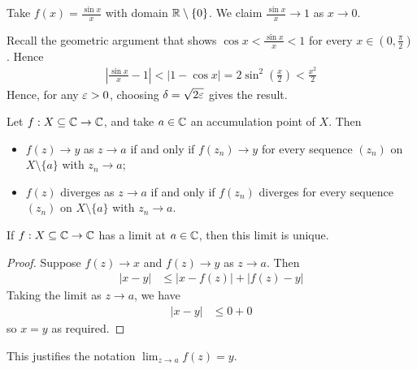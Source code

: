 \documentclass{../template/note}
\begin{document}
    \begin{example}
        Take \(f(x) = \frac{\sin x}{x}\) with domain \(\mathbb R \setminus \{0\}\). We claim \(\frac{\sin x}{x} \to 1\) as \(x \to 0\).
        
        Recall the geometric argument that shows \(\cos x < \frac{\sin x}{x} < 1\) for every \(x \in (0, \frac{\pi}2)\). Hence
        \begin{align*}
            \left|\frac{\sin x}x - 1\right| < \left|1-\cos x\right| = 2\sin^2\left(\frac x 2\right) < \frac{x^2}{2}
        \end{align*}
        Hence, for any \(\varepsilon > 0\), choosing \(\delta = \sqrt{2\varepsilon}\) gives the result.
    \end{example}
    
    \begin{lemma}
        Let \(f: X \subseteq \mathbb C \to \mathbb C\), and take \(a \in \mathbb C\) an accumulation point of \(X\). Then
        \begin{itemize}
            \item \(f(z) \to y\) as \(z \to a\) if and only if \(f(z_n) \to y\) for every sequence \((z_n)\) on \(X \setminus \{a\}\) with \(z_n \to a\);
            \item \(f(z)\) diverges as \(z \to a\) if and only if \(f(z_n)\) diverges for every sequence \((z_n)\) on \(X \setminus \{a\}\) with \(z_n \to a\).
        \end{itemize}
    \end{lemma}
    
    \begin{lemma}
        If \(f: X \subseteq \mathbb C \to \mathbb C\) has a limit at \(a \in \mathbb C\), then this limit is unique.
    \end{lemma}

    \begin{proof}
        Suppose \(f(z) \to x\) and \(f(z) \to y\) as \(z \to a\). Then
        \begin{align*}
            |x-y| &\leq |x-f(z)| + |f(z)-y|
        \end{align*}
        Taking the limit as \(z \to a\), we have
        \begin{align*}
            |x-y| &\leq 0 + 0
        \end{align*}
        so \(x=y\) as required.        
    \end{proof}    
    
    \begin{remark*}
        This justifies the notation \(\lim_{z \to a} f(z) = y\).
    \end{remark*}
    
\end{document}
